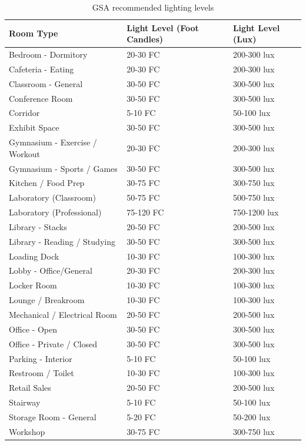 \begin{table} \centering
\caption{GSA recommended lighting levels \label{table:lighting-level-chart}}
\tabularnewline
\begin{tabular}{ |p{2in}|p{1in}|p{1in}| } \hline \textbf{Room Type} &
\textbf{Light Level (Foot Candles)} & \textbf{Light Level (Lux)} \\ 
\hline
Bedroom - Dormitory & 20-30 FC & 200-300 lux \\ 
\hline 
Cafeteria - Eating & 20-30 FC & 200-300 lux \\ 
\hline 
Classroom - General & 30-50 FC & 300-500 lux \\
\hline 
Conference Room & 30-50 FC & 300-500 lux \\ 
\hline 
Corridor & 5-10 FC & 50-100 lux \\ 
\hline Exhibit Space & 30-50 FC & 300-500 lux \\ 
\hline 
Gymnasium - Exercise / Workout & 20-30 FC & 200-300 lux \\ 
\hline 
Gymnasium - Sports / Games & 30-50 FC & 300-500 lux \\
 \hline Kitchen / Food Prep & 30-75 FC &
300-750 lux \\
 \hline Laboratory (Classroom) & 50-75 FC & 500-750 lux \\
 \hline
Laboratory (Professional) & 75-120 FC & 750-1200 lux \\
 \hline Library - Stacks
& 20-50 FC & 200-500 lux \\
 \hline Library - Reading / Studying & 30-50 FC &
300-500 lux \\
 \hline Loading Dock & 10-30 FC & 100-300 lux \\
 \hline Lobby -
Office/General & 20-30 FC & 200-300 lux \\
 \hline Locker Room & 10-30 FC &
100-300 lux \\
 \hline Lounge / Breakroom & 10-30 FC & 100-300 lux \\
 \hline
Mechanical / Electrical Room & 20-50 FC & 200-500 lux \\
 \hline Office - Open &
30-50 FC & 300-500 lux \\
 \hline Office - Private / Closed & 30-50 FC & 300-500
lux \\
 \hline Parking - Interior & 5-10 FC & 50-100 lux \\
 \hline Restroom /
Toilet & 10-30 FC & 100-300 lux \\
 \hline Retail Sales & 20-50 FC & 200-500 lux
\\
 \hline Stairway & 5-10 FC & 50-100 lux \\
 \hline Storage Room - General &
5-20 FC & 50-200 lux \\
 \hline Workshop & 30-75 FC & 300-750 lux \\
 \hline
\end{tabular}
\end{table}

